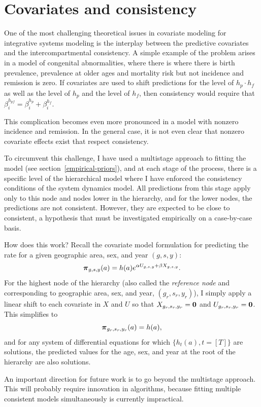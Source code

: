 \section{Covariates and consistency}
One of the most challenging theoretical issues in covariate modeling
for integrative systems modeling is the interplay between the
predictive covariates and the intercompartmental consistency.  A
simple example of the problem arises in a model of congenital
abnormalities, where there is where there is birth prevalence,
prevalence at older ages and mortality risk but not incidence and
remission is zero. If covariates are used to shift predictions for the
level of $h_{p}\cdot h_{f}$ as well as the level of $h_{p}$ and the
level of $h_{f}$, then consistency would require that
$\beta^{h_{pf}}_i = \beta^{h_p}_i + \beta^{h_f}_i$.

This complication becomes even more pronounced in a model with
nonzero incidence and remission.  In the general case, it is not
even clear that nonzero covariate effects exist that respect
consistency.

To circumvent this challenge, I have used a multistage approach to
fitting the model (see section~\ref{empirical-priors}), and at each
stage of the process, there is a specific level of the hierarchical
model where I have enforced the consistency conditions of the system
dynamics model.  All predictions from this stage apply only to this
node and nodes lower in the hierarchy, and for the lower nodes, the
predictions are not consistent.  However, they are expected to
be close to consistent, a hypothesis that must be investigated
empirically on a case-by-case basis.

How does this work?  Recall the covariate model formulation for
predicting the rate for a given geographic area, sex, and year $(g,s,y)$:
\[
{\boldsymbol{\pi}}_{g,s,y}(a) = h(a)e^{\alpha U_{g,s,y} + \beta X_{g,s,y}}.
\]
For the highest node of the hierarchy (also called the
\emph{reference node} and corresponding to geographic area, sex, and year, $(g_r, s_r,
y_r)$), I simply apply a linear shift to each covariate in $X$ and $U$
so that $X_{{g_r},{s_r},{y_r}} = \mathbf{0}$ and $U_{g_r,s_r,y_r} = \mathbf{0}$.  This
simplifies to \[ {\boldsymbol{\pi}}_{g_r,s_r,y_r}(a) = h(a), \] and for any system
of differential equations for which $\{h_t(a), t=[T]\}$ are
solutions, the predicted values for the age, sex, and year at the root of
the hierarchy are also solutions.

An important direction for future work is to go beyond the multistage
approach.  This will probably require innovation in algorithms,
because fitting multiple consistent models simultaneously is currently
impractical.

